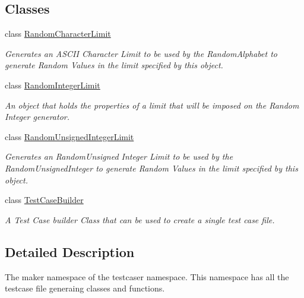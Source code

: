\subsection*{Classes}
\begin{DoxyCompactItemize}
\item 
class \hyperlink{classtestcaser_1_1maker_1_1RandomCharacterLimit}{Random\+Character\+Limit}
\begin{DoxyCompactList}\small\item\em Generates an A\+S\+C\+II Character Limit to be used by the Random\+Alphabet to generate Random Values in the limit specified by this object. \end{DoxyCompactList}\item 
class \hyperlink{classtestcaser_1_1maker_1_1RandomIntegerLimit}{Random\+Integer\+Limit}
\begin{DoxyCompactList}\small\item\em An object that holds the properties of a limit that will be imposed on the Random Integer generator. \end{DoxyCompactList}\item 
class \hyperlink{classtestcaser_1_1maker_1_1RandomUnsignedIntegerLimit}{Random\+Unsigned\+Integer\+Limit}
\begin{DoxyCompactList}\small\item\em Generates an Random\+Unsigned Integer Limit to be used by the Random\+Unsigned\+Integer to generate Random Values in the limit specified by this object. \end{DoxyCompactList}\item 
class \hyperlink{classtestcaser_1_1maker_1_1TestCaseBuilder}{Test\+Case\+Builder}
\begin{DoxyCompactList}\small\item\em A Test Case builder Class that can be used to create a single test case file. \end{DoxyCompactList}\end{DoxyCompactItemize}


\subsection{Detailed Description}
The maker namespace of the testcaser namespace. This namespace has all the testcase file generaing classes and functions. 